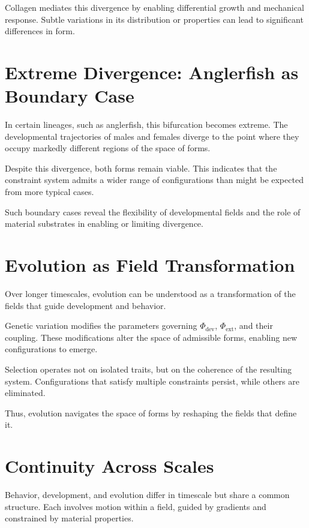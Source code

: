 \documentclass[11pt,oneside]{book}
\begin{document}
Collagen mediates this divergence by enabling differential growth and mechanical response. Subtle variations in its distribution or properties can lead to significant differences in form.

\section{Extreme Divergence: Anglerfish as Boundary Case}

In certain lineages, such as anglerfish, this bifurcation becomes extreme. The developmental trajectories of males and females diverge to the point where they occupy markedly different regions of the space of forms.

Despite this divergence, both forms remain viable. This indicates that the constraint system admits a wider range of configurations than might be expected from more typical cases.

Such boundary cases reveal the flexibility of developmental fields and the role of material substrates in enabling or limiting divergence.

\section{Evolution as Field Transformation}

Over longer timescales, evolution can be understood as a transformation of the fields that guide development and behavior.

Genetic variation modifies the parameters governing $\Phi_{\mathrm{dev}}$, $\Phi_{\mathrm{ext}}$, and their coupling. These modifications alter the space of admissible forms, enabling new configurations to emerge.

Selection operates not on isolated traits, but on the coherence of the resulting system. Configurations that satisfy multiple constraints persist, while others are eliminated.

Thus, evolution navigates the space of forms by reshaping the fields that define it.

\section{Continuity Across Scales}

Behavior, development, and evolution differ in timescale but share a common structure. Each involves motion within a field, guided by gradients and constrained by material properties.
\end{document}

